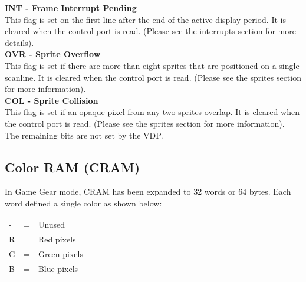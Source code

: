 \documentclass{article}
\begin{document}

\textbf{INT - Frame Interrupt Pending}                                  
\\

This flag is set on the first line after the end of the active display 
period.  It is cleared when the control port is read. (Please see the 
interrupts section for more details).                                   
\\

\textbf{OVR - Sprite Overflow}
\\

This flag is set if there are more than eight sprites that are positioned
on a single scanline. It is cleared when the control port is read. 
(Please see the sprites section for more information).                  
\\

\textbf{COL - Sprite Collision}
\\

This flag is set if an opaque pixel from any two sprites overlap. It is 
cleared when the control port is read. (Please see the sprites section
for more information).                                                  
\\

The remaining bits are not set by the VDP.

\subsection{Color RAM (CRAM)}

In Game Gear mode, CRAM has been expanded to 32 words or
64 bytes. Each word defined a single color as shown below: 

\begin{table}[H]
    \centering
    \begin{tabular}{l c l}
        - & = & Unused          \\ 
        R & = & Red pixels      \\ 
        G & = & Green pixels    \\ 
        B & = & Blue pixels     \\
    \end{tabular}
\end{table}
\end{document}
